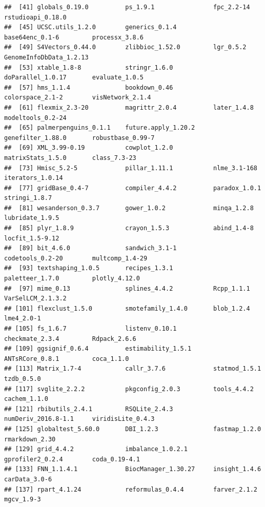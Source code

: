 \documentclass[
]{article}
\begin{document}
\begin{verbatim}
##  [41] globals_0.19.0          ps_1.9.1                fpc_2.2-14              rstudioapi_0.18.0      
##  [45] UCSC.utils_1.2.0        generics_0.1.4          base64enc_0.1-6         processx_3.8.6         
##  [49] S4Vectors_0.44.0        zlibbioc_1.52.0         lgr_0.5.2               GenomeInfoDbData_1.2.13
##  [53] xtable_1.8-8            stringr_1.6.0           doParallel_1.0.17       evaluate_1.0.5         
##  [57] hms_1.1.4               bookdown_0.46           colorspace_2.1-2        visNetwork_2.1.4       
##  [61] flexmix_2.3-20          magrittr_2.0.4          later_1.4.8             modeltools_0.2-24      
##  [65] palmerpenguins_0.1.1    future.apply_1.20.2     genefilter_1.88.0       robustbase_0.99-7      
##  [69] XML_3.99-0.19           cowplot_1.2.0           matrixStats_1.5.0       class_7.3-23           
##  [73] Hmisc_5.2-5             pillar_1.11.1           nlme_3.1-168            iterators_1.0.14       
##  [77] gridBase_0.4-7          compiler_4.4.2          paradox_1.0.1           stringi_1.8.7          
##  [81] wesanderson_0.3.7       gower_1.0.2             minqa_1.2.8             lubridate_1.9.5        
##  [85] plyr_1.8.9              crayon_1.5.3            abind_1.4-8             locfit_1.5-9.12        
##  [89] bit_4.6.0               sandwich_3.1-1          codetools_0.2-20        multcomp_1.4-29        
##  [93] textshaping_1.0.5       recipes_1.3.1           paletteer_1.7.0         plotly_4.12.0          
##  [97] mime_0.13               splines_4.4.2           Rcpp_1.1.1              VarSelLCM_2.1.3.2      
## [101] flexclust_1.5.0         smotefamily_1.4.0       blob_1.2.4              lme4_2.0-1             
## [105] fs_1.6.7                listenv_0.10.1          checkmate_2.3.4         Rdpack_2.6.6           
## [109] ggsignif_0.6.4          estimability_1.5.1      ANTsRCore_0.8.1         coca_1.1.0             
## [113] Matrix_1.7-4            callr_3.7.6             statmod_1.5.1           tzdb_0.5.0             
## [117] svglite_2.2.2           pkgconfig_2.0.3         tools_4.4.2             cachem_1.1.0           
## [121] rbibutils_2.4.1         RSQLite_2.4.3           numDeriv_2016.8-1.1     viridisLite_0.4.3      
## [125] globaltest_5.60.0       DBI_1.2.3               fastmap_1.2.0           rmarkdown_2.30         
## [129] grid_4.4.2              imbalance_1.0.2.1       gprofiler2_0.2.4        coda_0.19-4.1          
## [133] FNN_1.1.4.1             BiocManager_1.30.27     insight_1.4.6           carData_3.0-6          
## [137] rpart_4.1.24            reformulas_0.4.4        farver_2.1.2            mgcv_1.9-3             

\end{verbatim}
\end{document}
